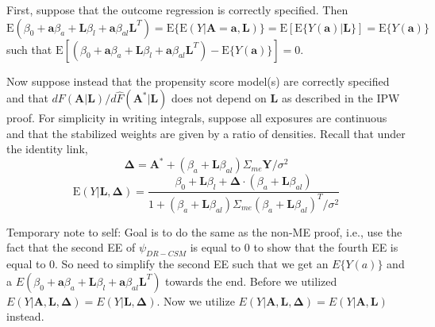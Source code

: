 \documentclass[12pt]{article}
\begin{document}
First, suppose that the outcome regression is correctly specified. Then $\text{E}( \beta_{0} + \bm{a}\beta_{a} + \bm{L}\beta_{l} + \bm{a}\beta_{al}\bm{L}^{T}) = \text{E} \{ \text{E}(Y | \bm{A} = \bm{a}, \bm{L}) \} = \text{E}[\text{E} \{ Y(\bm{a}) | \bm{L} \}] = \text{E} \{ Y(\bm{a}) \}$ such that $\text{E}[(\beta_{0} + \bm{a}\beta_{a} + \bm{L}\beta_{l} + \bm{a}\beta_{al}\bm{L}^{T}) - \text{E} \{ Y(\bm{a}) \}] = 0$.

Now suppose instead that the propensity score model(s) are correctly specified and that $dF(\bm{A} | \bm{L}) / d\hat{F}(\bm{A}^{*} | \bm{L})$ does not depend on $\bm{L}$ as described in the IPW proof. For simplicity in writing integrals, suppose all exposures are continuous and that the stabilized weights are given by a ratio of densities. Recall that under the identity link,
\begin{equation*}
\bm{\Delta} = \bm{A}^{*} + (\beta_{a} + \bm{L}\beta_{al}) \Sigma_{me}\bm{Y} / \sigma^{2}
\end{equation*}
\begin{equation*}
\text{E}(Y | \bm{L}, \bm{\Delta}) = \frac{\beta_{0} + \bm{L}\beta_{l} + \bm{\Delta} \cdot (\beta_{a} + \bm{L}\beta_{al})}{1 + (\beta_{a} + \bm{L}\beta_{al}) \Sigma_{me} (\beta_{a} + \bm{L}\beta_{al})^{T} / \sigma^{2}}
\end{equation*}

Temporary note to self: Goal is to do the same as the non-ME proof, i.e., use the fact that the second EE of $\psi_{DR-CSM}$ is equal to 0 to show that the fourth EE is equal to 0. So need to simplify the second EE such that we get an $E\{ Y(a) \}$ and a $E(\beta_{0} + \bm{a}\beta_{a} + \bm{L}\beta_{l} + \bm{a}\beta_{al}\bm{L}^{T})$ towards the end. Before we utilized $E(Y | \bm{A}, \bm{L}, \bm{\Delta}) = E(Y | \bm{L}, \bm{\Delta})$. Now we utilize $E(Y | \bm{A}, \bm{L}, \bm{\Delta}) = E(Y | \bm{A}, \bm{L})$ instead.
\end{document}
